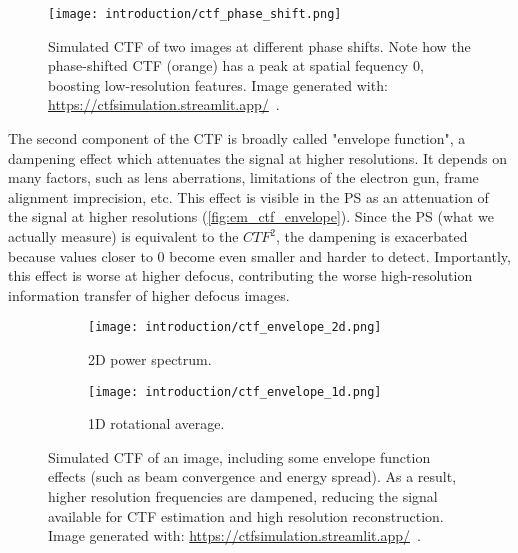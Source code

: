 \begin{figure}[ht]
    \centering
    \texttt{[image: introduction/ctf\_phase\_shift.png]}
    \caption[CTF: effect of phase shift]{Simulated CTF of two images at different phase shifts. Note how the phase-shifted CTF (orange) has a peak at spatial fequency \num{0}, boosting low-resolution features. Image generated with: \url{https://ctfsimulation.streamlit.app/}~\cite{jiangWebbasedSimulationContrast2001}.}
    \label{fig:em_ctf_phase_shift}
\end{figure}

The second component of the CTF is broadly called "envelope function", a dampening effect which attenuates the signal at higher resolutions.
It depends on many factors, such as lens aberrations, limitations of the electron gun, frame alignment imprecision, etc.
This effect is visible in the PS as an attenuation of the signal at higher resolutions (\autoref{fig:em_ctf_envelope}).
Since the PS (what we actually measure) is equivalent to the $CTF^2$, the dampening is exacerbated because values closer to \num{0} become even smaller and harder to detect.
Importantly, this effect is worse at higher defocus, contributing the worse high-resolution information transfer of higher defocus images.

\begin{figure}[ht]
    \centering
    \begin{subfigure}[B]{.42\textwidth}
        \centering
        \texttt{[image: introduction/ctf\_envelope\_2d.png]}
        \caption{2D power spectrum.}
        \label{fig:em_ctf_envelope_2d}
    \end{subfigure}%
    \hfill
    \begin{subfigure}[B]{.55\textwidth}
        \centering
        \texttt{[image: introduction/ctf\_envelope\_1d.png]}
        \caption{1D rotational average.}
        \label{fig:em_ctf_envelope_1d}
    \end{subfigure}%
    \caption[CTF: effect of the envelope function]{Simulated CTF of an image, including some envelope function effects (such as beam convergence and energy spread). As a result, higher resolution frequencies are dampened, reducing the signal available for CTF estimation and high resolution reconstruction. Image generated with: \url{https://ctfsimulation.streamlit.app/}~\cite{jiangWebbasedSimulationContrast2001}.}
    \label{fig:em_ctf_envelope}
\end{figure}

